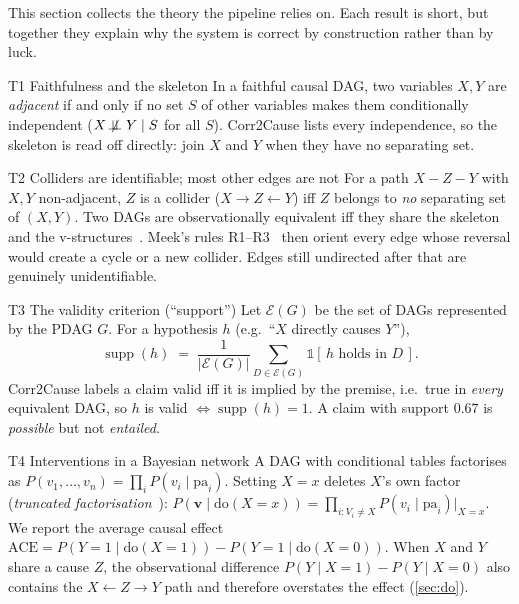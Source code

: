 \documentclass[11pt,a4paper]{article}
\newcommand{\doop}{\mathrm{do}}
\begin{document}
This section collects the theory the pipeline relies on. Each result is short, but together they explain why the
system is correct by construction rather than by luck.

\begin{theorybox}{T1 \quad Faithfulness and the skeleton}
In a faithful causal DAG, two variables $X,Y$ are \emph{adjacent} if and only if no set $S$ of other variables
makes them conditionally independent ($X \not\!\perp\!\!\!\perp Y \mid S$ for all $S$). Corr2Cause lists every
independence, so the skeleton is read off directly: join $X$ and $Y$ when they have no separating set.
\end{theorybox}

\begin{theorybox}{T2 \quad Colliders are identifiable; most other edges are not}
For a path $X - Z - Y$ with $X,Y$ non-adjacent, $Z$ is a collider ($X\!\rightarrow\!Z\!\leftarrow\!Y$) iff $Z$
belongs to \emph{no} separating set of $(X,Y)$. Two DAGs are observationally equivalent iff they share the skeleton and
the v-structures~\cite{verma1990}. Meek's rules R1--R3~\cite{meek1995} then orient every edge whose reversal would
create a cycle or a new collider. Edges still undirected after that are genuinely unidentifiable.
\end{theorybox}

\begin{theorybox}{T3 \quad The validity criterion (``support'')}
Let $\mathcal{E}(G)$ be the set of DAGs represented by the PDAG $G$. For a hypothesis $h$ (e.g.\ ``$X$ directly causes $Y$''),
\[
  \operatorname{supp}(h) \;=\; \frac{1}{|\mathcal{E}(G)|}\sum_{D\in\mathcal{E}(G)} \mathbb{1}\!\left[\,h \text{ holds in } D\,\right].
\]
Corr2Cause labels a claim valid iff it is implied by the premise, i.e.\ true in \emph{every} equivalent DAG, so
$h$ is valid $\Leftrightarrow \operatorname{supp}(h)=1$. A claim with support $0.67$ is \emph{possible} but not \emph{entailed}.
\end{theorybox}

\begin{theorybox}{T4 \quad Interventions in a Bayesian network}
A DAG with conditional tables factorises as $P(v_1,\dots,v_n)=\prod_i P(v_i\mid \mathrm{pa}_i)$. Setting $X{=}x$
deletes $X$'s own factor (\emph{truncated factorisation}~\cite{pearl2009}):
$P(\mathbf{v}\mid\doop(X{=}x))=\prod_{i:V_i\neq X}P(v_i\mid\mathrm{pa}_i)\big|_{X=x}$.
We report the average causal effect $\mathrm{ACE}=P(Y{=}1\mid\doop(X{=}1))-P(Y{=}1\mid\doop(X{=}0))$.
When $X$ and $Y$ share a cause $Z$, the observational difference $P(Y\mid X{=}1)-P(Y\mid X{=}0)$ also contains
the $X\leftarrow Z\rightarrow Y$ path and therefore overstates the effect (\cref{sec:do}).
\end{theorybox}
\end{document}
